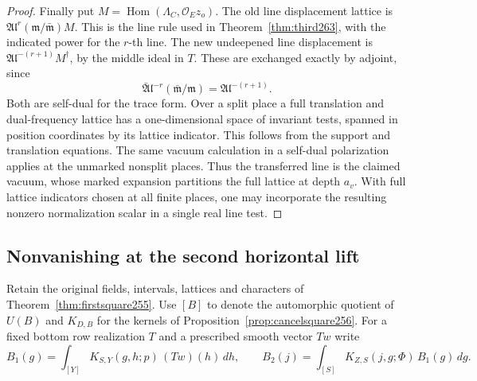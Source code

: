 \documentclass[a4paper,11pt]{article}
\theoremstyle{definition}
\theoremstyle{remark}
\numberwithin{equation}{section}
\begin{document}
\begin{proof}
Finally put \(M=\operatorname{Hom}(\Lambda_C,\mathcal O_Ez_o)\).
The old line displacement lattice is
\(\mathfrak A\mathfrak l^r(\mathfrak m/\bar{\mathfrak m})M\).
This is the line rule used in Theorem~\ref{thm:third263}, with
the indicated power for the \(r\)-th line. The new undeepened
line displacement is
\(\mathfrak A\mathfrak l^{-(r+1)} M^\dagger\), by the middle
ideal in \(T\). These are exchanged exactly by adjoint, since
\[
    \bar{\mathfrak A}\mathfrak l^{-r}
           (\bar{\mathfrak m}/\mathfrak m)
       =\mathfrak A\mathfrak l^{-(r+1)} .
\]
Both are self-dual for the trace form. Over a split place a
full translation and dual-frequency lattice has a one-dimensional
space of invariant tests, spanned in position coordinates by
its lattice indicator. This follows from the support and
translation equations. The same vacuum calculation in a
self-dual polarization applies at the unmarked nonsplit places.
Thus the transferred line is the claimed vacuum, whose marked
expansion partitions the full lattice at depth \(a_v\).
With full lattice indicators chosen at all finite places, one
may incorporate the resulting nonzero normalization scalar
in a single real line test.
\end{proof}

\subsection{Nonvanishing at the second horizontal lift}\label{nav:IV-35}
Retain the original fields, intervals, lattices and characters of
Theorem~\ref{thm:firstsquare255}. Use \([B]\) to denote the
automorphic quotient of \(U(B)\) and \(K_{D,B}\) for the kernels
of Proposition~\ref{prop:cancelsquare256}. For a fixed bottom row
realization \(T\) and a prescribed smooth vector \(Tw\) write
\[
 B_1(g)=\int_{[Y]}K_{S,Y}(g,h;p)\,(Tw)(h)\,dh,\qquad
 B_2(j)=\int_{[S]}K_{Z,S}(j,g;\Phi)\,B_1(g)\,dg .
\]
\end{document}
